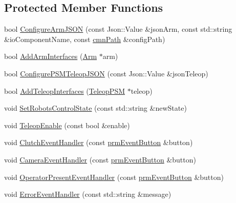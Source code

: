 \subsection*{Protected Member Functions}
\begin{DoxyCompactItemize}
\item 
bool \hyperlink{classmts_intuitive_research_kit_console_ab7a49c4fc3c6fb1d5084ecac3c1d0638}{Configure\-Arm\-J\-S\-O\-N} (const Json\-::\-Value \&json\-Arm, const std\-::string \&io\-Component\-Name, const \hyperlink{classcmn_path}{cmn\-Path} \&config\-Path)
\item 
bool \hyperlink{classmts_intuitive_research_kit_console_a2546842ca57c8809c505da07bf0c05da}{Add\-Arm\-Interfaces} (\hyperlink{classmts_intuitive_research_kit_console_1_1_arm}{Arm} $\ast$arm)
\item 
bool \hyperlink{classmts_intuitive_research_kit_console_ae4ff1ef079f10359183222cfb0f78bf9}{Configure\-P\-S\-M\-Teleop\-J\-S\-O\-N} (const Json\-::\-Value \&json\-Teleop)
\item 
bool \hyperlink{classmts_intuitive_research_kit_console_a4147b87b74db40681142428ca18673a3}{Add\-Teleop\-Interfaces} (\hyperlink{classmts_intuitive_research_kit_console_1_1_teleop_p_s_m}{Teleop\-P\-S\-M} $\ast$teleop)
\item 
void \hyperlink{classmts_intuitive_research_kit_console_aef47fafd720fa875976c2e79d3d5243a}{Set\-Robots\-Control\-State} (const std\-::string \&new\-State)
\item 
void \hyperlink{classmts_intuitive_research_kit_console_a1df8a166835f2a36715a5f1261fe17dc}{Teleop\-Enable} (const bool \&enable)
\item 
void \hyperlink{classmts_intuitive_research_kit_console_aad3fb1569eb002ce34e199e4e6f13493}{Clutch\-Event\-Handler} (const \hyperlink{classprm_event_button}{prm\-Event\-Button} \&button)
\item 
void \hyperlink{classmts_intuitive_research_kit_console_a6cce6a45b2711924b0c5c28e2e90b009}{Camera\-Event\-Handler} (const \hyperlink{classprm_event_button}{prm\-Event\-Button} \&button)
\item 
void \hyperlink{classmts_intuitive_research_kit_console_a482f7247bb8cab51d7f3f4765e90d0ca}{Operator\-Present\-Event\-Handler} (const \hyperlink{classprm_event_button}{prm\-Event\-Button} \&button)
\item 
void \hyperlink{classmts_intuitive_research_kit_console_ae86b321490db7b16fe6c56ab5fb77c2d}{Error\-Event\-Handler} (const std\-::string \&message)
\item 

\end{DoxyCompactItemize}
